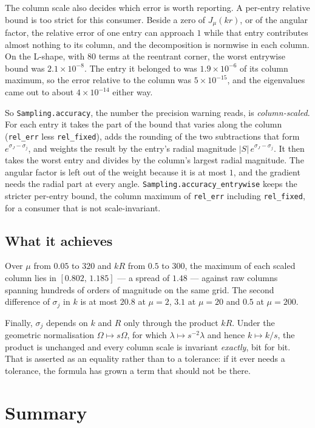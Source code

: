 \documentclass[11pt]{article}
\theoremstyle{remark}
\newcommand{\code}[1]{\texttt{#1}}
\begin{document}
The column scale also decides which error is worth reporting. A per-entry relative bound is
too strict for this consumer. Beside a zero of $J_\mu(kr)$, or of the angular factor, the
relative error of one entry can approach $1$ while that entry contributes almost nothing to
its column, and the decomposition is normwise in each column. On the L-shape, with 80 terms at
the reentrant corner, the worst entrywise bound was $2.1\times10^{-8}$. The entry it belonged
to was $1.9\times10^{-6}$ of its column maximum, so the error relative to the column was
$5\times10^{-15}$, and the eigenvalues came out to about $4\times10^{-14}$ either way.

So \code{Sampling.accuracy}, the number the precision warning reads, is \emph{column-scaled}.
For each entry it takes the part of the bound that varies along the column (\code{rel\_err}
less \code{rel\_fixed}), adds the rounding of the two subtractions that form
$e^{\sigma_J-\sigma_j}$, and weights the result by the entry's radial magnitude
$|S|\,e^{\sigma_J-\sigma_j}$. It then takes the worst entry and divides by the column's largest
radial magnitude. The angular factor is left out of the weight because it is at most $1$, and
the gradient needs the radial part at every angle. \code{Sampling.accuracy\_entrywise} keeps
the stricter per-entry bound, the column maximum of \code{rel\_err} including
\code{rel\_fixed}, for a consumer that is not scale-invariant.

\subsection{What it achieves}

Over $\mu$ from $0.05$ to $320$ and $kR$ from $0.5$ to $300$, the maximum of each scaled
column lies in $[0.802,\,1.185]$ --- a spread of $1.48$ --- against raw columns spanning
hundreds of orders of magnitude on the same grid. The second difference of $\sigma_j$ in $k$
is at most $20.8$ at $\mu=2$, $3.1$ at $\mu=20$ and $0.5$ at $\mu=200$.

Finally, $\sigma_j$ depends on $k$ and $R$ only through the product $kR$. Under the geometric
normalisation $\Omega\mapsto s\Omega$, for which $\lambda\mapsto s^{-2}\lambda$ and hence
$k\mapsto k/s$, the product is unchanged and every column scale is invariant \emph{exactly},
bit for bit. That is asserted as an equality rather than to a tolerance: if it ever needs a
tolerance, the formula has grown a term that should not be there.

\section{Summary}
\end{document}
